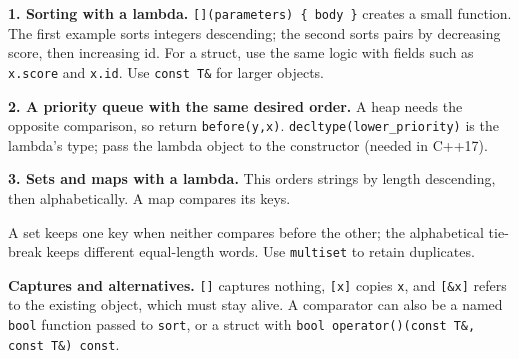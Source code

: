 \par\medskip
\begin{minipage}{\linewidth}
\raggedright
\textbf{1. Sorting with a lambda.} \texttt{[](parameters) \{ body \}}
creates a small function. The first example sorts integers descending;
the second sorts pairs by decreasing score, then increasing id.
For a struct, use the same logic with fields such as \texttt{x.score}
and \texttt{x.id}. Use \texttt{const T\&} for larger objects.

\end{minipage}

\par\medskip
\begin{minipage}{\linewidth}
\raggedright
\textbf{2. A priority queue with the same desired order.}
A heap needs the opposite comparison, so return \texttt{before(y,x)}.
\texttt{decltype(lower\_priority)} is the lambda's type; pass the
lambda object to the constructor (needed in C++17).

\end{minipage}

\par\medskip
\begin{minipage}{\linewidth}
\raggedright
\textbf{3. Sets and maps with a lambda.} This orders strings by
length descending, then alphabetically. A map compares its keys.

A set keeps one key when neither compares before the other;
the alphabetical tie-break keeps different equal-length words.
Use \texttt{multiset} to retain duplicates.
\end{minipage}

\par\medskip
\textbf{Captures and alternatives.} \texttt{[]} captures nothing,
\texttt{[x]} copies \texttt{x}, and \texttt{[\&x]} refers to the
existing object, which must stay alive. A comparator can also be a
named \texttt{bool} function passed to \texttt{sort}, or a struct
with \texttt{bool operator()(const T\&, const T\&) const}.
